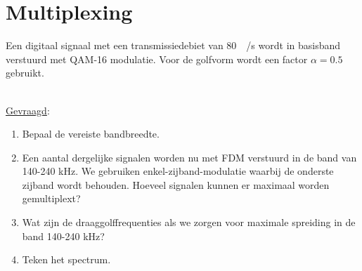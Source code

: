 \documentclass[kulak]{kulakarticle}
\begin{document}
	\newpage
	\section{Multiplexing}

	Een digitaal signaal met een transmissiedebiet van \SI{80}{\kilo\bit/\second} wordt in basisband verstuurd met
	QAM-16 modulatie. Voor de golfvorm wordt een factor \(\alpha = 0.5\) gebruikt.

	\hfill \\
	\underline{Gevraagd}:
	\begin{enumerate}
		\item Bepaal de vereiste bandbreedte.
		\item Een aantal dergelijke signalen worden nu met FDM verstuurd in de band van 140-240 kHz. We gebruiken enkel-zijband-modulatie waarbij de onderste zijband wordt behouden. Hoeveel signalen kunnen er maximaal worden gemultiplext?
		\item Wat zijn de draaggolffrequenties als we zorgen voor maximale spreiding in de band 140-240 kHz?
		\item Teken het spectrum.
	\end{enumerate}
\end{document}
